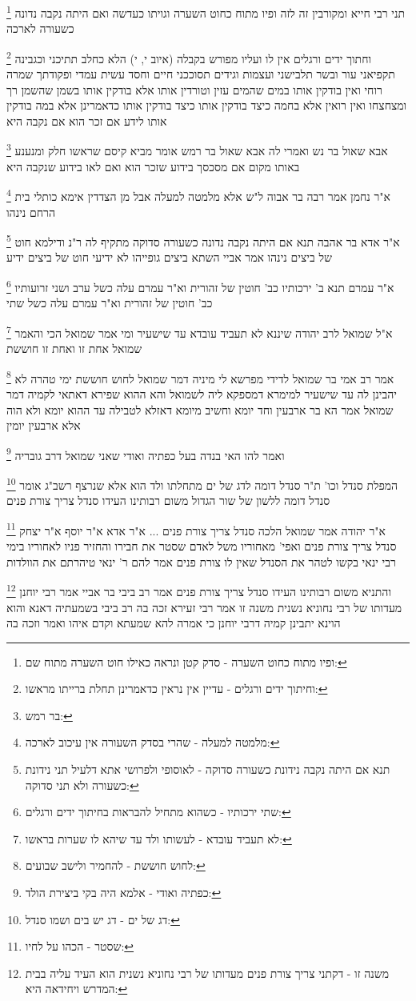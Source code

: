 \documentclass[12pt, openany]{book}
\newcommand{\footnotecomment}[1]{
	\renewcommand\thefootnote{}
	\footnote{#1}}
\newcommand{\commenta}[1]{\footnotecomment{#1}}
\begin{document}
{\commenta{ופיו מתוח כחוט השערה - סדק קטן ונראה כאילו חוט השערה מתוח שם:}
תני רבי חייא ומקורבין זה לזה ופיו מתוח כחוט השערה וגויתו כעדשה ואם היתה נקבה נדונה כשעורה לארכה 
\commenta{וחיתוך ידים ורגלים - עדיין אין נראין כדאמרינן תחלת ברייתו מראשו:}
וחתוך ידים ורגלים אין לו ועליו מפורש בקבלה (איוב י, י) הלא כחלב תתיכני וכגבינה תקפיאני עור ובשר תלבישני ועצמות וגידים תסוככני חיים וחסד עשית עמדי ופקודתך שמרה רוחי 
ואין בודקין אותו במים שהמים עזין
וטורדין אותו אלא בודקין אותו בשמן שהשמן רך ומצחצחו ואין רואין אלא בחמה 
כיצד בודקין אותו כיצד בודקין אותו כדאמרינן אלא במה בודקין אותו לידע אם זכר הוא אם נקבה היא 
\commenta{בר רמש:}
אבא שאול בר נש ואמרי לה אבא שאול בר רמש אומר מביא קיסם שראשו חלק ומנענע באותו מקום אם מסכסך בידוע שזכר הוא ואם לאו בידוע שנקבה היא 
\commenta{מלמטה למעלה - שהרי בסדק השעורה אין עיכוב לארכה:}
א"ר נחמן אמר רבה בר אבוה ל"ש אלא מלמטה למעלה אבל מן הצדדין אימא כותלי בית הרחם נינהו 
\commenta{תנא אם היתה נקבה נידונת כשעורה סדוקה - לאוסופי ולפרושי אתא דלעיל תני נידונת כשעורה ולא תני סדוקה:}
א"ר אדא בר אהבה תנא אם היתה נקבה נדונה כשעורה סדוקה מתקיף לה ר"נ ודילמא חוט של ביצים נינהו אמר אביי השתא ביצים גופייהו לא ידיעי חוט של ביצים ידיע 
\commenta{שתי ירכותיו - כשהוא מתחיל להבראות בחיתוך ידים ורגלים:}
א"ר עמרם תנא ב' ירכותיו כב' חוטין של זהורית וא"ר עמרם עלה כשל ערב ושני זרועותיו כב' חוטין של זהורית וא"ר עמרם עלה כשל שתי 
\commenta{לא תעביד עובדא - לעשותו ולד עד שיהא לו שערות בראשו:}
א"ל שמואל לרב יהודה שיננא לא תעביד עובדא עד שישעיר ומי אמר שמואל הכי והאמר שמואל אחת זו ואחת זו חוששת 
\commenta{לחוש חוששת - להחמיר ולישב שבועים:}
אמר רב אמי בר שמואל לדידי מפרשא לי מיניה דמר שמואל לחוש חוששת ימי טהרה לא יהבינן לה עד שישעיר 
למימרא דמספקא ליה לשמואל והא ההוא שפירא דאתאי לקמיה דמר שמואל אמר הא בר ארבעין וחד יומא וחשיב מיומא דאזלא לטבילה עד ההוא יומא ולא הוה אלא ארבעין יומין
\commenta{כפתיה ואודי - אלמא היה בקי ביצירת הולד:}
ואמר להו האי בנדה בעל כפתיה ואודי שאני שמואל דרב גובריה
\commenta{דג של ים - דג יש בים ושמו סנדל:}
המפלת סנדל וכו' ת"ר סנדל דומה לדג של ים מתחלתו ולד הוא אלא שנרצף רשב"ג אומר סנדל דומה ללשון של שור הגדול משום רבותינו העידו סנדל צריך צורת פנים 
\commenta{שסטר - הכהו על לחיו:}
א"ר יהודה אמר שמואל הלכה סנדל צריך צורת פנים ... א"ר אדא א"ר יוסף א"ר יצחק סנדל צריך צורת פנים ואפי' מאחוריו משל לאדם שסטר את חבירו והחזיר פניו לאחוריו 
בימי רבי ינאי בקשו לטהר את הסנדל שאין לו צורת פנים אמר להם ר' ינאי טיהרתם את הוולדות 
\commenta{משנה זו - דקתני צריך צורת פנים מעדותו של רבי נחוניא נשנית הוא העיד עליה בבית המדרש ויחידאה היא:}
והתניא משום רבותינו העידו סנדל צריך צורת פנים אמר רב ביבי בר אביי אמר רבי יוחנן מעדותו של רבי נחוניא נשנית משנה זו אמר רבי זעירא זכה בה רב ביבי בשמעתיה דאנא והוא הוינא יתבינן קמיה דרבי יוחנן כי אמרה להא שמעתא וקדם איהו ואמר וזכה בה 
}
\end{document}
